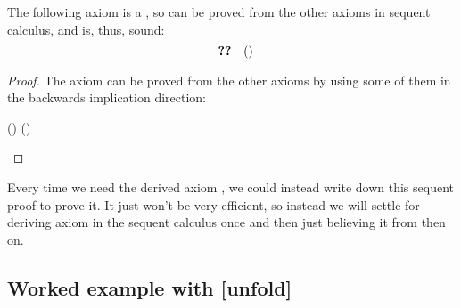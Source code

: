 \documentclass[11pt,twoside]{scrartcl}
\begin{document}
\begin{lemma}
  The following axiom is a , so can be proved from the other axioms in sequent calculus, and is, thus, sound:
  \[
  \cinferenceRuleQuote{unfold}
  \]
\end{lemma}
\begin{proof}
The axiom  can be proved from the other axioms by using some of them in the backwards implication direction:
\begin{sequentdeduction}[array]
\linfer[composeb]
{\linfer[ifb]
  {\linfer[whileiterateb]
    {\lclose}
    {\lsequent{} {{\dbox{\pwhile{\ivr}{\ausprg}}{\ausfml}}\lbisubjunct
 {\dbox{\pifs{\ivr}{\plgroup\ausprg;\pwhile{\ivr}{\ausprg}\prgroup}}{\ausfml}}}}
 }
  {\lsequent{} {{\dbox{\pwhile{\ivr}{\ausprg}}{\ausfml}}\lbisubjunct
 {(\ivr\limply\dbox{\ausprg;\pwhile{\ivr}{\ausprg}}{\ausfml}) \land (\lnot\ivr\limply\ausfml)}}}
}
{\lsequent{} {{\dbox{\pwhile{\ivr}{\ausprg}}{\ausfml}}\lbisubjunct
 {(\ivr\limply\dbox{\ausprg}{\dbox{\pwhile{\ivr}{\ausprg}}{\ausfml}}) \land (\lnot\ivr\limply\ausfml)}}}
\end{sequentdeduction}
\end{proof}

Every time we need the derived axiom , we could instead write down this sequent proof to prove it.
It just won't be very efficient, so instead we will settle for deriving axiom  in the sequent calculus once and then just believing it from then on.

\subsection{Worked example with [unfold]}
\end{document}
